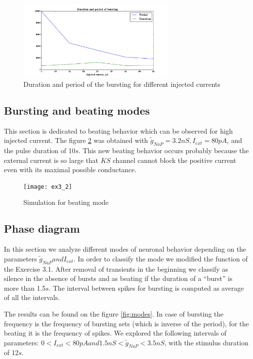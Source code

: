 \documentclass[a4paper,11pt]{article} %
\begin{document}
\begin{figure}[H]
    \centering
    \includegraphics[width=0.7\textwidth]{bduration_bperiod}
    \caption{Duration and period of the bursting for different injected currents}
    \label{fig:bdur_bper}
\end{figure}

\subsection{Bursting and beating modes}

This section is dedicated to beating behavior which
can be observed for high injected current. The figure \ref{fig:beat} was obtained
with $\tilde{g}_{NaP} = 3.2nS, I_{ext} = 80pA$, and the pulse duration of 10$s$.
This new beating behavior occurs probably because the external current is so
large that $KS$ channel cannot block the positive current even with
its maximal possible conductance. 

\begin{figure}[H]
    \centering
    \texttt{[image: ex3\_2]}
    \caption{Simulation for beating mode}
    \label{fig:beat}
\end{figure}


\subsection{Phase diagram}

In this section we analyze different modes of neuronal behavior
depending on the parameters  $\tilde{g}_{NaP} and I_{ext}$.
In order to classify the mode we modified the function of the Exercise 3.1.
After removal of transients in the beginning we classify as silence in
the absence of bursts and as beating if the duration of a ``burst'' is more than 1.5$s$.
The interval between spikes for bursting is computed as average of all the intervals.

The results can be found on the figure \ref{fig:modes}. In case of bursting
the frequency is the frequency of bursting sets (which is inverse of the period),
for the beating it is the frequency of spikes. We explored the following intervals of
parameters: $0 < I_{ext} < 80pA and 1.5nS < \tilde{g}_{NaP} < 3.5nS$, with
the stimulus duration of 12$s$.
\end{document}
